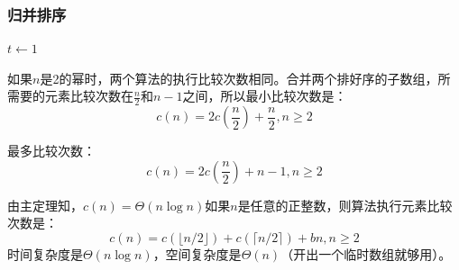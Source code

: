 \documentclass[./../main.tex]{subfiles}
\begin{document}
\subsubsection{归并排序}
\begin{algorithm}[htbp]
    \BlankLine
    $t\leftarrow1$\\
    \caption{BOTTOMUP-MERGESORT}
\end{algorithm}

\begin{algorithm}[htbp]
    \BlankLine
    \caption{MERGESORT}
\end{algorithm}

如果$n$是2的幂时，两个算法的执行比较次数相同。合并两个排好序的子数组，所需要的元素比较次数在$\frac{n}{2}$和$n-1$之间，所以最小比较次数是：
\[
    c(n)=2c(\frac{n}{2})+\frac{n}{2}, n\ge 2
\]

最多比较次数：
\[
    c(n)=2c(\frac{n}{2})+n-1, n\ge 2
\]

由主定理知，$c(n)=\Theta(n\log n)$如果$n$是任意的正整数，则算法执行元素比较次数是：
\[
    c(n)=c(\lfloor  n/2 \rfloor)+c(\lceil  n/2 \rceil)+bn,n\ge 2
\]
时间复杂度是$\Theta(n\log n)$，空间复杂度是$\Theta(n)$（开出一个临时数组就够用）。
\end{document}
